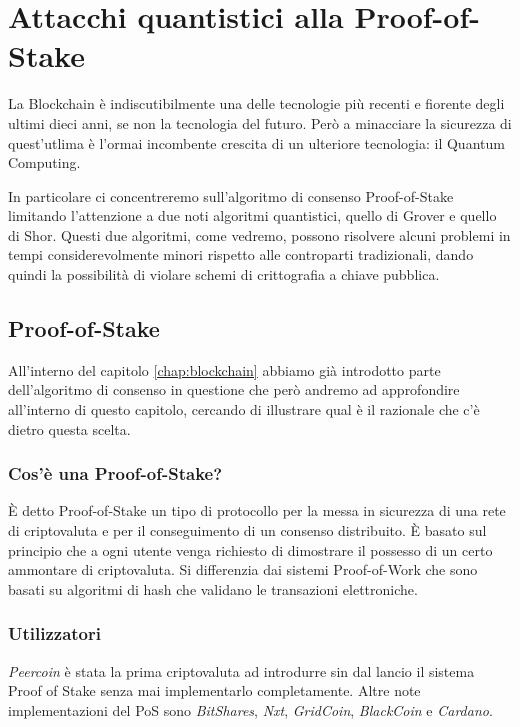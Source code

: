 \chapter{Attacchi quantistici alla Proof-of-Stake}
La Blockchain è indiscutibilmente una delle tecnologie più recenti e fiorente degli ultimi dieci anni, se non la tecnologia del futuro. Però a minacciare la sicurezza di quest'utlima è l'ormai incombente crescita di un ulteriore tecnologia: il Quantum Computing.

In particolare ci concentreremo sull'algoritmo di consenso Proof-of-Stake limitando l'attenzione a due noti algoritmi quantistici, quello di Grover e quello di Shor. Questi due algoritmi, come vedremo, possono risolvere alcuni problemi in tempi considerevolmente minori rispetto alle controparti tradizionali, dando quindi la possibilità di violare schemi di crittografia a chiave pubblica.

\section{Proof-of-Stake}
All'interno del capitolo \ref{chap:blockchain} abbiamo già introdotto parte dell'algoritmo di consenso in questione che però andremo ad approfondire all'interno di questo capitolo, cercando di illustrare qual è il razionale che c'è dietro questa scelta.

\subsection{Cos'è una Proof-of-Stake?}
È detto Proof-of-Stake un tipo di protocollo per la messa in sicurezza di una rete di criptovaluta e per il conseguimento di un consenso distribuito. È basato sul principio che a ogni utente venga richiesto di dimostrare il possesso di un certo ammontare di criptovaluta. Si differenzia dai sistemi Proof-of-Work che sono basati su algoritmi di hash che validano le transazioni elettroniche.

\subsection{Utilizzatori}
\textit{Peercoin} è stata la prima criptovaluta ad introdurre sin dal lancio il sistema Proof of Stake senza mai implementarlo completamente. Altre note implementazioni del PoS sono \textit{BitShares}, \textit{Nxt}, \textit{GridCoin}, \textit{BlackCoin} e \textit{Cardano}.


